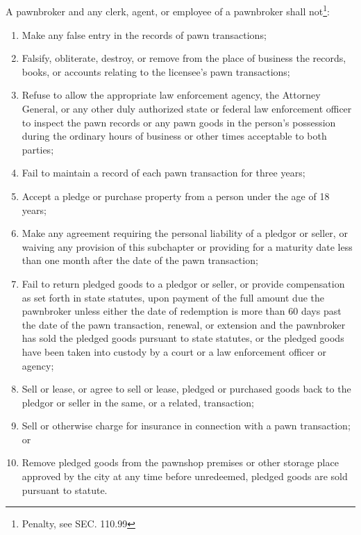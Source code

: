 \subsection{}
A pawnbroker and any clerk, agent, or employee of a pawnbroker shall not\footnote{Penalty, see SEC. 110.99}:
\begin{enumerate}[{\indent}1)]
    \item Make any false entry in the records of pawn transactions;
    \item Falsify, obliterate, destroy, or remove from the place of business the records, books, or accounts relating to the licensee’s pawn transactions;
    \item Refuse to allow the appropriate law enforcement agency, the Attorney General, or any other duly authorized state or federal law enforcement officer to inspect the pawn records or any pawn goods in the person’s possession during the ordinary hours of business or other times acceptable to both parties;
    \item Fail to maintain a record of each pawn transaction for three years;
    \item Accept a pledge or purchase property from a person under the age of 18 years;
    \item Make any agreement requiring the personal liability of a pledgor or seller, or waiving any provision of this subchapter or providing for a maturity date less than one month after the date of the pawn transaction;
    \item Fail to return pledged goods to a pledgor or seller, or provide compensation as set forth in state statutes, upon payment of the full amount due the pawnbroker unless either the date of redemption is more than 60 days past the date of the pawn transaction, renewal, or extension and the pawnbroker has sold the pledged goods pursuant to state statutes, or the pledged goods have been taken into custody by a court or a law enforcement officer or agency;
    \item Sell or lease, or agree to sell or lease, pledged or purchased goods back to the pledgor or seller in the same, or a related, transaction;
    \item Sell or otherwise charge for insurance in connection with a pawn transaction; or
    \item Remove pledged goods from the pawnshop premises or other storage place approved by the city at any time before unredeemed, pledged goods are sold pursuant to statute.
\end{enumerate}

